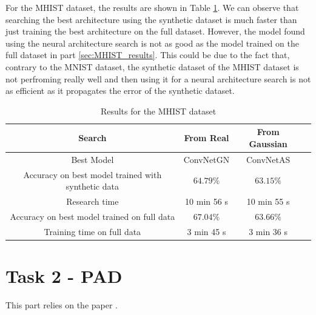 \documentclass[onecolumn]{IEEEtran}
\begin{document}
For the MHIST dataset, the results are shown in Table \ref{tab:NAS_results_MHIST}. We can observe that searching the best architecture using the synthetic dataset is much faster than just training the best architecture on the full dataset. However, the model found using the neural architecture search is not as good as the model trained on the full dataset in part \ref{sec:MHIST_results}. This could be due to the fact that, contrary to the MNIST dataset, the synthetic dataset of the MHIST dataset is not perfroming really well and then using it for a neural architecture search is not as efficient as it propagates the error of the synthetic dataset.

\begin{table}[H]
    \centering
    \begin{tabular}{|c|c|c|c|}
        \hline
        Search & From Real & From Gaussian \\
        \hline
        Best Model & ConvNetGN & ConvNetAS\\
        \hline
        Accuracy on best model trained with synthetic data & $64.79\%$ & $63.15\%$ \\
        \hline
        Research time & 10 min 56 s & 10 min 55 s \\
        \hline
        Accuracy on best model trained on full data & $67.04\%$ & $63.66\%$ \\
        \hline
        Training time on full data & 3 min 45 s & 3 min 36 s \\
        \hline
    \end{tabular}
    \caption{Results for the MHIST dataset}
    \label{tab:NAS_results_MHIST}
\end{table}

\section{Task 2 - PAD}
This part relies on the paper \cite{li2024prioritize}.
\end{document}
